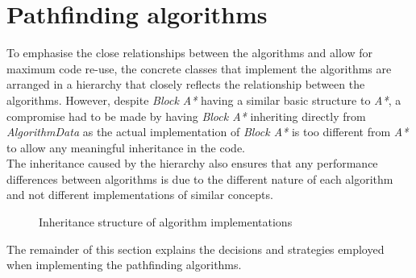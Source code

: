 \documentclass[12pt,notitlepage]{report}
\begin{document}
\section{Pathfinding algorithms}
To emphasise the close relationships between the algorithms and allow for maximum code re-use, the concrete classes that implement the algorithms are arranged in a hierarchy that closely reflects the relationship between the algorithms. However, despite {\em Block A*} having a similar basic structure to {\em A*}, a compromise had to be made by having {\em Block A*} inheriting directly from {\em AlgorithmData} as the actual implementation of {\em Block A*} is too different from {\em A*} to allow any meaningful inheritance in the code.\\

\noindent
The inheritance caused by the hierarchy also ensures that any performance differences between algorithms is due to the different nature of each algorithm and not different implementations of similar concepts.\\

\begin{figure}
\centering
{}
\caption{Inheritance structure of algorithm implementations}
\end{figure}

\noindent
The remainder of this section explains the decisions and strategies employed when implementing the pathfinding algorithms.
\end{document}
